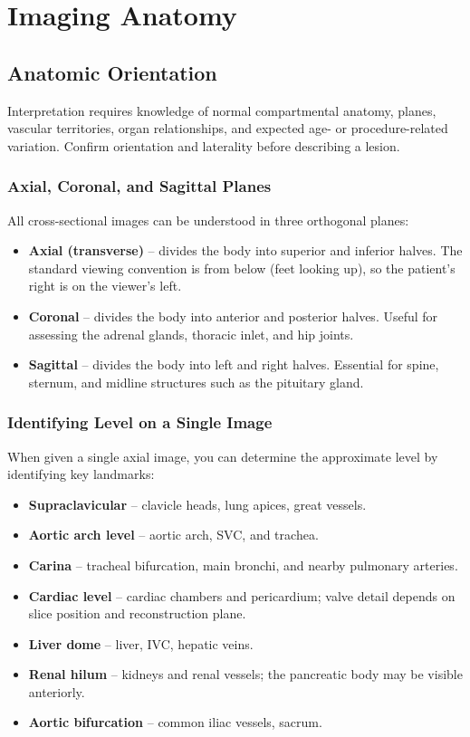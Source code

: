 \chapter{Imaging Anatomy}

\label{ch:ch30_anatomy}

\section{Anatomic Orientation}
Interpretation requires knowledge of normal compartmental anatomy, planes, vascular territories, organ relationships, and expected age- or procedure-related variation. Confirm orientation and laterality before describing a lesion.

\subsection{Axial, Coronal, and Sagittal Planes}
All cross-sectional images can be understood in three orthogonal planes:
\begin{itemize}
    \item \textbf{Axial (transverse)} -- divides the body into superior and inferior halves. The standard viewing convention is from below (feet looking up), so the patient's right is on the viewer's left.
    \item \textbf{Coronal} -- divides the body into anterior and posterior halves. Useful for assessing the adrenal glands, thoracic inlet, and hip joints.
    \item \textbf{Sagittal} -- divides the body into left and right halves. Essential for spine, sternum, and midline structures such as the pituitary gland.
\end{itemize}

\subsection{Identifying Level on a Single Image}
When given a single axial image, you can determine the approximate level by identifying key landmarks:
\begin{itemize}
    \item \textbf{Supraclavicular} -- clavicle heads, lung apices, great vessels.
    \item \textbf{Aortic arch level} -- aortic arch, SVC, and trachea.
    \item \textbf{Carina} -- tracheal bifurcation, main bronchi, and nearby pulmonary arteries.
    \item \textbf{Cardiac level} -- cardiac chambers and pericardium; valve detail depends on slice position and reconstruction plane.
    \item \textbf{Liver dome} -- liver, IVC, hepatic veins.
    \item \textbf{Renal hilum} -- kidneys and renal vessels; the pancreatic body may be visible anteriorly.
    \item \textbf{Aortic bifurcation} -- common iliac vessels, sacrum.
\end{itemize}

